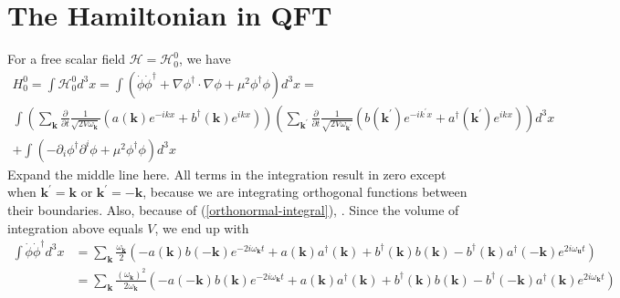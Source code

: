 \section{The Hamiltonian in QFT}
For a free scalar field $\mathcal{H}=\mathcal{H}_{0}^{0}$, we have
$$
\begin{array}{c}
      H_{0}^{0}=\int \mathcal{H}_{0}^{0} d^{3} x=\int\left(\dot{\phi} \dot{\phi}^{\dagger}+\nabla \phi^{\dagger} \cdot \nabla \phi+\mu^{2} \phi^{\dagger} \phi\right) d^{3} x= \\
     \int\left(\sum_{\mathbf{k}} \frac{\partial}{\partial t} \frac{1}{\sqrt{2 V \omega_{\mathbf{k}}}}\left(a(\mathbf{k}) e^{-i k x}+b^{\dagger}(\mathbf{k}) e^{i k x}\right)\right)\left(\sum_{\mathbf{k}^{\prime}} \frac{\partial}{\partial t} \frac{1}{\sqrt{2 V \omega_{\mathbf{k}^{\prime}}}}\left(b\left(\mathbf{k}^{\prime}\right) e^{-i k^{\prime} x}+a^{\dagger}\left(\mathbf{k}^{\prime}\right) e^{i k x}\right)\right) d^{3} x\\
     +\int\left(-\partial_{i} \phi^{\dagger} \partial^{i} \phi+\mu^{2} \phi^{\dagger} \phi\right) d^{3} x
\end{array}
$$
Expand the middle line here. All terms in the integration result in zero except when $\mathbf{k}^{\prime}=\mathbf{k}$ or $\mathbf{k}^{\prime}=-\mathbf{k}$, because we are integrating orthogonal functions between their boundaries. Also, because of (\ref{orthonormal-integral}), . Since the volume of integration above equals $V$, we end up with
\begin{equation}
\begin{aligned}
\int \dot{\phi} \dot{\phi}^{\dagger} d^{3} x &=\sum_{\mathbf{k}} \frac{\omega_{\mathbf{k}}}{2}\left(-a(\mathbf{k}) b(-\mathbf{k}) e^{-2 i \omega_{\mathbf{k}} t}+a(\mathbf{k}) a^{\dagger}(\mathbf{k})+b^{\dagger}(\mathbf{k}) b(\mathbf{k})-b^{\dagger}(\mathbf{k}) a^{\dagger}(-\mathbf{k}) e^{2 i \omega_{\mathbf{u}} t}\right) \\
&=\sum_{\mathbf{k}} \frac{\left(\omega_{\mathbf{k}}\right)^{2}}{2 \omega_{\mathbf{k}}}\left(-a(-\mathbf{k}) b(\mathbf{k}) e^{-2 i \omega_{\mathbf{k}} t}+a(\mathbf{k}) a^{\dagger}(\mathbf{k})+b^{\dagger}(\mathbf{k}) b(\mathbf{k})-b^{\dagger}(-\mathbf{k}) a^{\dagger}(\mathbf{k}) e^{2 i \omega_{\mathbf{k}} t}\right)
\end{aligned}
\end{equation}
